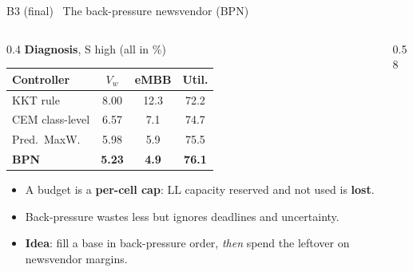 \documentclass[aspectratio=169,10pt,xcolor={table,dvipsnames}]{beamer}
\newcommand{\ours}{\rowcolor{good!14}}
\begin{document}
\begin{frame}{B3 (final) \textbullet\ The back-pressure newsvendor (BPN)}
\begin{columns}[T]
\begin{column}{0.4\textwidth}
\small
\textbf{Diagnosis}, S high (all in \%)\\[3pt]
\scriptsize
\setlength{\tabcolsep}{3pt}
\begin{tabular}{lccc}
\toprule
Controller & $V_w$ & eMBB & Util. \\
\midrule
KKT rule & 8.00 & 12.3 & 72.2 \\
CEM class-level & 6.57 & 7.1 & 74.7 \\
Pred.\ MaxW. & 5.98 & 5.9 & 75.5 \\
\ours \textbf{BPN} & \textbf{5.23} & \textbf{4.9} & \textbf{76.1} \\
\bottomrule
\end{tabular}
\vspace{0.4em}
\begin{itemize}\footnotesize
  \item A budget is a \textbf{per-cell cap}: LL capacity reserved and not used is \textbf{lost}.
  \item Back-pressure wastes less but ignores deadlines and uncertainty.
  \item \textbf{Idea}: fill a base in back-pressure order, \emph{then} spend the leftover on newsvendor margins.
\end{itemize}
\end{column}
\begin{column}{0.58\textwidth}
\centering
{}
\end{column}
\end{columns}
\end{frame}
\end{document}
